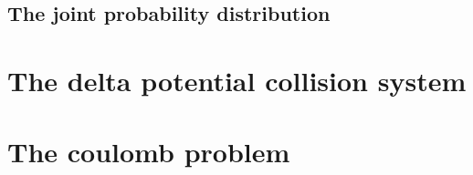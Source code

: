 \subsection{The joint probability distribution}

\section{The delta potential collision system}

\section{The coulomb problem}